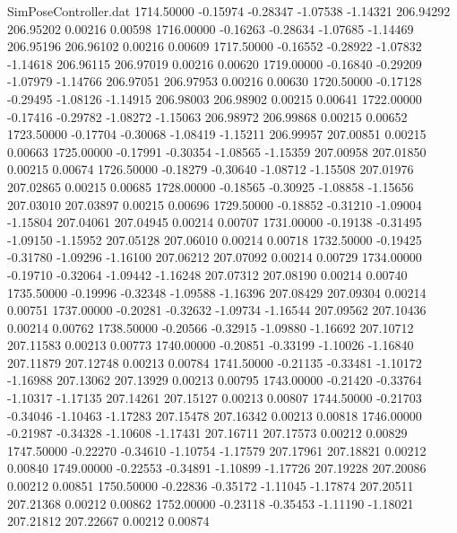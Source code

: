 \begin{filecontents}{SimPoseController.dat}
1714.50000   -0.15974   -0.28347    -1.07538   -1.14321  206.94292  206.95202    0.00216    0.00598
1716.00000   -0.16263   -0.28634    -1.07685   -1.14469  206.95196  206.96102    0.00216    0.00609
1717.50000   -0.16552   -0.28922    -1.07832   -1.14618  206.96115  206.97019    0.00216    0.00620
1719.00000   -0.16840   -0.29209    -1.07979   -1.14766  206.97051  206.97953    0.00216    0.00630
1720.50000   -0.17128   -0.29495    -1.08126   -1.14915  206.98003  206.98902    0.00215    0.00641
1722.00000   -0.17416   -0.29782    -1.08272   -1.15063  206.98972  206.99868    0.00215    0.00652
1723.50000   -0.17704   -0.30068    -1.08419   -1.15211  206.99957  207.00851    0.00215    0.00663
1725.00000   -0.17991   -0.30354    -1.08565   -1.15359  207.00958  207.01850    0.00215    0.00674
1726.50000   -0.18279   -0.30640    -1.08712   -1.15508  207.01976  207.02865    0.00215    0.00685
1728.00000   -0.18565   -0.30925    -1.08858   -1.15656  207.03010  207.03897    0.00215    0.00696
1729.50000   -0.18852   -0.31210    -1.09004   -1.15804  207.04061  207.04945    0.00214    0.00707
1731.00000   -0.19138   -0.31495    -1.09150   -1.15952  207.05128  207.06010    0.00214    0.00718
1732.50000   -0.19425   -0.31780    -1.09296   -1.16100  207.06212  207.07092    0.00214    0.00729
1734.00000   -0.19710   -0.32064    -1.09442   -1.16248  207.07312  207.08190    0.00214    0.00740
1735.50000   -0.19996   -0.32348    -1.09588   -1.16396  207.08429  207.09304    0.00214    0.00751
1737.00000   -0.20281   -0.32632    -1.09734   -1.16544  207.09562  207.10436    0.00214    0.00762
1738.50000   -0.20566   -0.32915    -1.09880   -1.16692  207.10712  207.11583    0.00213    0.00773
1740.00000   -0.20851   -0.33199    -1.10026   -1.16840  207.11879  207.12748    0.00213    0.00784
1741.50000   -0.21135   -0.33481    -1.10172   -1.16988  207.13062  207.13929    0.00213    0.00795
1743.00000   -0.21420   -0.33764    -1.10317   -1.17135  207.14261  207.15127    0.00213    0.00807
1744.50000   -0.21703   -0.34046    -1.10463   -1.17283  207.15478  207.16342    0.00213    0.00818
1746.00000   -0.21987   -0.34328    -1.10608   -1.17431  207.16711  207.17573    0.00212    0.00829
1747.50000   -0.22270   -0.34610    -1.10754   -1.17579  207.17961  207.18821    0.00212    0.00840
1749.00000   -0.22553   -0.34891    -1.10899   -1.17726  207.19228  207.20086    0.00212    0.00851
1750.50000   -0.22836   -0.35172    -1.11045   -1.17874  207.20511  207.21368    0.00212    0.00862
1752.00000   -0.23118   -0.35453    -1.11190   -1.18021  207.21812  207.22667    0.00212    0.00874

\end{filecontents}

